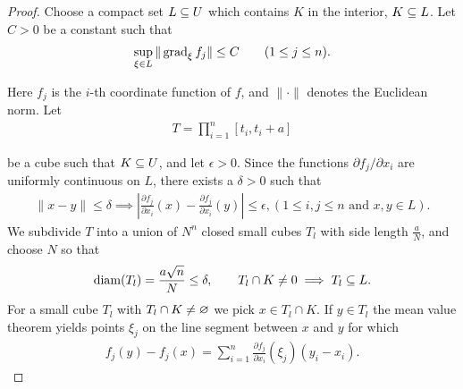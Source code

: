 \begin{proof}
  Choose a compact set $L\subseteq U$ which contains $K$ in the interior, $K\subseteq L$. Let 
  $C>0$ be a constant such that 
  \begin{align}\label{eq:11-4}
    \sup_{\xi\in L}\|\operatorname{grad}_\xi f_j\| \leq C\qquad (1\le j \le n).
  \end{align}

  Here $f_j$ is the $i$-th coordinate function of $f$, and $\|\cdot\|$ denotes the Euclidean norm.
  Let 
  \begin{align*}
    T = \prod_{i=1}^n [t_i, t_i + a]
  \end{align*}

  be a cube such that $K\subseteq U$, and let $\epsilon>0$. Since the functions $\partial f_j/\partial x_i$ 
  are uniformly continuous on $L$, there exists a $\delta >0$ such that
  \begin{align}\label{eq:11-5}
    \|x-y\|\le \delta \implies 
    \left|\frac{\partial f_j }{\partial x_i }(x) - \frac{\partial f_j }{\partial x_i}(y)\right|\le \epsilon,
    (1\le i,j\le n \text{ and } x, y\in L).
  \end{align}
  We subdivide $T$ into a union of $N^n$ closed small cubes $T_l$ with side length $\frac aN$,
  and choose $N$ so that
  \begin{align}\label{eq:11-6}
    \mathrm{diam}(T_l) = \frac{a\sqrt{n}}{N}\le \delta, \qquad T_l\cap K \neq 0\implies T_l\subseteq L.
  \end{align}
  For a small cube $T_l$ with $T_l\cap K\neq \varnothing$ we pick $x\in T_l\cap K$. If $y\in T_l$ the 
  mean value theorem yields points $\xi_j$ on the line segment between $x$ and $y$ for which
  \begin{align}\label{eq:11-7}
    f_j(y) - f_j(x) 
    = \sum_{i=1}^{n }{\frac{\partial f_j }{\partial x_i }(\xi_j)(y_i - x_i)}.
  \end{align}


\end{proof}
